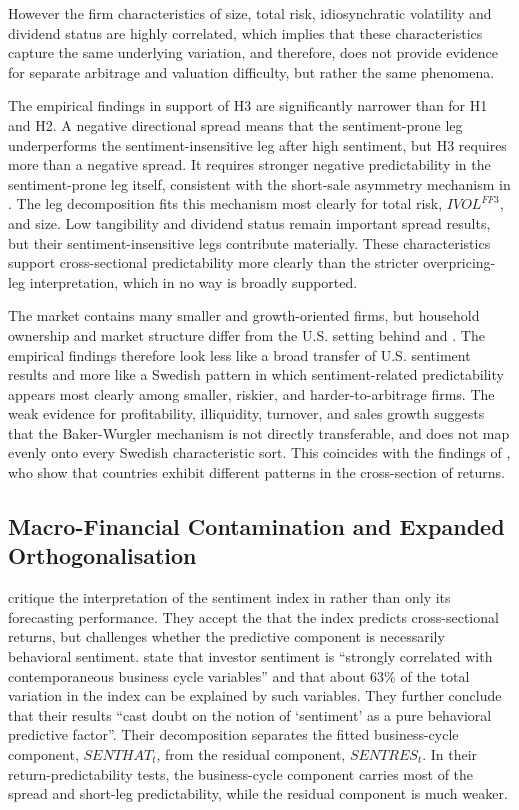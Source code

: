\documentclass[11pt]{article}
\newcommand{\var}[1]{\ensuremath{#1}}
\begin{document}
However the firm characteristics of size, total risk, idiosynchratic volatility and dividend status are highly correlated, which implies that these characteristics capture the same underlying variation, and therefore, does not provide evidence for separate arbitrage and valuation difficulty, but rather the same phenomena.

The empirical findings in support of H3 are significantly narrower than for H1 and H2. A negative directional spread means that the sentiment-prone leg underperforms the sentiment-insensitive leg after high sentiment, but H3 requires more than a negative spread. It requires stronger negative predictability in the sentiment-prone leg itself, consistent with the short-sale asymmetry mechanism in \citet{stambaugh2012short}. The leg decomposition fits this mechanism most clearly for total risk, \var{IVOL^{FF3}}, and size. Low tangibility and dividend status remain important spread results, but their sentiment-insensitive legs contribute materially. These characteristics support cross-sectional predictability more clearly than the stricter overpricing-leg interpretation, which in no way is broadly supported.

The market contains many smaller and growth-oriented firms, but household ownership and market structure differ from the U.S. setting behind \citet{baker2006sentiment} and \citet{stambaugh2012short}. The empirical findings therefore look less like a broad transfer of U.S. sentiment results and more like a Swedish pattern in which sentiment-related predictability appears most clearly among smaller, riskier, and harder-to-arbitrage firms. The weak evidence for profitability, illiquidity, turnover, and sales growth suggests that the Baker-Wurgler mechanism is not directly transferable, and does not map evenly onto every Swedish characteristic sort. This coincides with the findings of \citet{finter2012german}, who show that countries exhibit different patterns in the cross-section of returns.

\subsection{Macro-Financial Contamination and Expanded Orthogonalisation}
\citet{sibley2012sentimental} critique the interpretation of the sentiment index in \citet{baker2006sentiment} rather than only its forecasting performance. They accept the that the index predicts cross-sectional returns, but challenges whether the predictive component is necessarily behavioral sentiment. \citet{sibley2012sentimental} state that investor sentiment is \enquote{strongly correlated with contemporaneous business cycle variables} and that about 63\% of the total variation in the index can be explained by such variables. They further conclude that their results \enquote{cast doubt on the notion of \enquote{sentiment} as a pure behavioral predictive factor}. Their decomposition separates the fitted business-cycle component, \var{SENTHAT_t}, from the residual component, \var{SENTRES_t}. In their return-predictability tests, the business-cycle component carries most of the spread and short-leg predictability, while the residual component is much weaker. 
\end{document}
